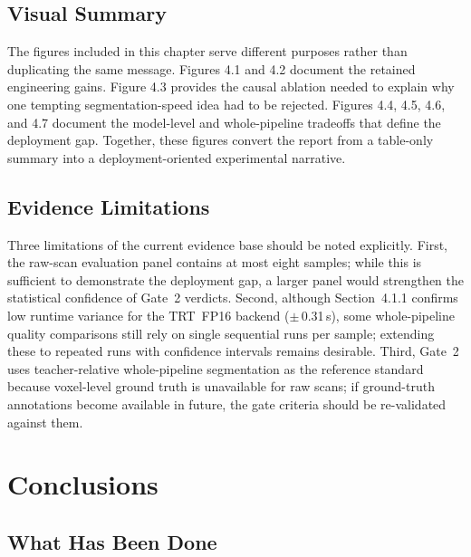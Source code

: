 \hypertarget{visual-summary}{%
\section{Visual Summary}\label{visual-summary}}

The figures included in this chapter serve different purposes rather
than duplicating the same message. Figures 4.1 and 4.2 document the
retained engineering gains. Figure 4.3 provides the causal ablation
needed to explain why one tempting segmentation-speed idea had to be
rejected. Figures 4.4, 4.5, 4.6, and 4.7 document the model-level and
whole-pipeline tradeoffs that define the deployment gap. Together, these
figures convert the report from a table-only summary into a
deployment-oriented experimental narrative.

\hypertarget{evidence-limitations}{%
\section{Evidence Limitations}\label{evidence-limitations}}

Three limitations of the current evidence base should be noted explicitly. First, the raw-scan evaluation panel contains at most eight samples; while this is sufficient to demonstrate the deployment gap, a larger panel would strengthen the statistical confidence of Gate~2 verdicts. Second, although Section~4.1.1 confirms low runtime variance for the TRT~FP16 backend ($\pm$\,0.31\,s), some whole-pipeline quality comparisons still rely on single sequential runs per sample; extending these to repeated runs with confidence intervals remains desirable. Third, Gate~2 uses teacher-relative whole-pipeline segmentation as the reference standard because voxel-level ground truth is unavailable for raw scans; if ground-truth annotations become available in future, the gate criteria should be re-validated against them.

\hypertarget{conclusions}{%
\chapter{Conclusions}\label{conclusions}}

\hypertarget{what-has-been-done}{%
\section{What Has Been Done}\label{what-has-been-done}}

